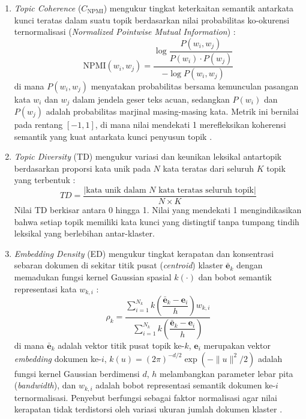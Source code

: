 \begin{enumerate}[label=\alph*.]
	\item \textit{Topic Coherence} ($C_{\text{NPMI}}$) mengukur tingkat keterkaitan semantik antarkata kunci teratas dalam suatu topik berdasarkan nilai probabilitas ko-okurensi ternormalisasi (\textit{Normalized Pointwise Mutual Information}) \citep{2685324}:
	\begin{equation}
		\text{NPMI}(w_i, w_j) = \frac{\log \dfrac{P(w_i, w_j)}{P(w_i) \cdot P(w_j)}}{-\log P(w_i, w_j)}
	\end{equation}
	di mana $P(w_i, w_j)$ menyatakan probabilitas bersama kemunculan pasangan kata $w_i$ dan $w_j$ dalam jendela geser teks acuan, sedangkan $P(w_i)$ dan $P(w_j)$ adalah probabilitas marjinal masing-masing kata. Metrik ini bernilai pada rentang $[-1, 1]$, di mana nilai mendekati 1 merefleksikan koherensi semantik yang kuat antarkata kunci penyusun topik \citep{11271424}.

	\item \textit{Topic Diversity} (TD) mengukur variasi dan keunikan leksikal antartopik berdasarkan proporsi kata unik pada $N$ kata teratas dari seluruh $K$ topik yang terbentuk \citep{dieng2020topic}:
	\begin{equation}
		TD = \frac{|\text{kata unik dalam } N \text{ kata teratas seluruh topik}|}{N \times K}
	\end{equation}
	Nilai TD berkisar antara 0 hingga 1. Nilai yang mendekati 1 mengindikasikan bahwa setiap topik memiliki kata kunci yang distingtif tanpa tumpang tindih leksikal yang berlebihan antar-klaster.

	\item \textit{Embedding Density} (ED) mengukur tingkat kerapatan dan konsentrasi sebaran dokumen di sekitar titik pusat (\textit{centroid}) klaster $\bar{\mathbf{e}}_k$ dengan memadukan fungsi kernel Gaussian spasial $k(\cdot)$ dan bobot semantik representasi kata $w_{k,i}$ \citep{2009-00672}:
	\begin{equation}
		\rho_k = \frac{\sum_{i=1}^{N_k} k\!\left(\dfrac{\bar{\mathbf{e}}_k - \mathbf{e}_i}{h}\right) w_{k,i}}{\sum_{i=1}^{N_k} k\!\left(\dfrac{\bar{\mathbf{e}}_k - \mathbf{e}_i}{h}\right)}
	\end{equation}
	di mana $\bar{\mathbf{e}}_k$ adalah vektor titik pusat topik ke-$k$, $\mathbf{e}_i$ merupakan vektor \textit{embedding} dokumen ke-$i$, $k(u) = (2\pi)^{-d/2} \exp(-\lVert u \rVert^2 / 2)$ adalah fungsi kernel Gaussian berdimensi $d$, $h$ melambangkan parameter lebar pita (\textit{bandwidth}), dan $w_{k,i}$ adalah bobot representasi semantik dokumen ke-$i$ ternormalisasi. Penyebut berfungsi sebagai faktor normalisasi agar nilai kerapatan tidak terdistorsi oleh variasi ukuran jumlah dokumen klaster \citep{2009-00672}.


\end{enumerate}
